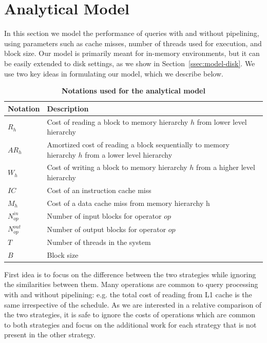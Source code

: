 \section{Analytical Model}\label{sec:model}
In this section we model the performance of queries with and without pipelining, using parameters such as cache misses, number of threads used for execution, and block size.
Our model is primarily meant for in-memory environments, but it can be easily extended to disk settings, as we show in Section~\ref{ssec:model-disk}.
We use two key ideas in formulating our model, which we describe below.

\begin{table}
	\centering
	\begin{tabular}{|l|p{10cm}|}
		\hline
		\textbf{Notation} & \textbf{Description} \\
		\hline
		$R_h$  & Cost of reading a block to memory hierarchy $h$ from lower level hierarchy \\ \hline
		$AR_h$ & Amortized cost of reading a block sequentially to memory hierarchy $h$ from a lower level hierarchy \\ \hline
		$W_h$ & Cost of writing a block to memory hierarchy $h$ from a higher level hierarchy \\ \hline
		$IC$ & Cost of an instruction cache miss \\ \hline
		$M_h$ & Cost of a data cache miss from memory hierarchy h \\ \hline
		$N^{in}_{op}$ & Number of input blocks for operator $op$ \\ \hline
		$N^{out}_{op}$ & Number of output blocks for operator $op$\\ \hline
		$T$ & Number of threads in the system\\ \hline
		$B$ & Block size \\ \hline	
	\end{tabular}
	\caption{\textbf{Notations used for the analytical model}}
	\label{table:analytical-model-notation}
\end{table}

First idea is to focus on the difference between the two strategies while ignoring the similarities between them.
Many operations are common to query processing with and without pipelining: e.g. the total cost of reading from L1 cache is the same irrespective of the schedule.
As we are interested in a relative comparison of the two strategies, it is safe to ignore the costs of operations which are common to both strategies and focus on the additional work for each strategy that is not present in the other strategy. 

